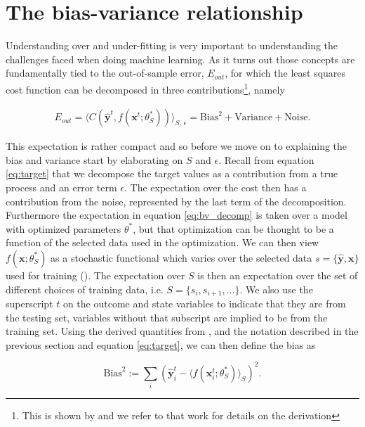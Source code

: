 \section{The bias-variance relationship}\label{sec:bv}

Understanding over and under-fitting is very important to understanding the challenges faced when doing machine learning. As it turns out those concepts are fundamentally tied to the out-of-sample error, $E_{out}$, for which the least squares cost function can be decomposed in three contributions\footnote{This is shown by \citet{Mehta2019} and we refer to that work for details on the derivation}, namely

\begin{align}\label{eq:bv_decomp}
E_{out} = \langle C(\mathbf{\hat{y}}^t, f(\mathbf{x}^t; \theta^*_S))\rangle_{S,\, \epsilon} = \text{Bias}^2 + \text{Variance} + \text{Noise}.
\end{align}

\noindent This expectation is rather compact and so before we move on to explaining the bias and variance start by elaborating on $S$ and $\epsilon$. Recall from equation \ref{eq:target} that we decompose the target values as a contribution from a true process and an error term $\epsilon$. The expectation over the cost then has a contribution from the noise, represented by the last term of the decomposition. Furthermore the expectation in equation \ref{eq:bv_decomp} is taken over a model with optimized parameters $\theta^*$, but that optimization can be thought to be a function of the selected data used in the optimization. We can then view $f(\mathbf{x}; \theta^*_S)$ as a stochastic functional which varies over the selected data $s = \{\mathbf{\hat{y}}, \mathbf{x}\}$ used for training (\cite{Mehta2019}). The expectation over $S$ is then an expectation over the set of different choices of training data, i.e. $S = \{s_i, s_{i+1}, \dots\}$. We also use the superscript $t$ on the outcome and state variables to indicate that they are from the testing set, variables without that subscript are implied to be from the training set.
 Using the derived quantities from \citet{Mehta2019}, and the notation described in the previous section and equation \ref{eq:target}, we can then define the bias as

\begin{equation}\label{eq:bias}
\text{Bias}^2 := \sum_i (\mathbf{\hat{y}}_i^t - \langle f(\mathbf{x}_i^t; \theta_S^*)\rangle_S)^2.
\end{equation}

